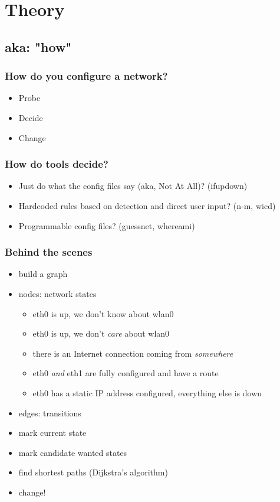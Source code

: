\documentclass[ignorenonframetext]{beamer}
\begin{document}
\section{Theory}
\subsection{aka: "how"}
\begin{frame}
  \frametitle{How do you configure a network?}
  \begin{itemize}
    \item Probe
    \item Decide
    \item Change
  \end{itemize}
\end{frame}

\begin{frame}
  \frametitle{How do tools decide?}
  \begin{itemize}
    \item Just do what the config files say (aka, Not At All)? (ifupdown)
    \item Hardcoded rules based on detection and direct user input? (n-m, wicd)
    \item Programmable config files? (guessnet, whereami)
  \end{itemize}
\end{frame}

\begin{frame}
  \frametitle{Behind the scenes}
  \begin{itemize}
    \item build a graph
    \item nodes: network states
    \begin{itemize}
      \item eth0 is up, we don't know about wlan0
      \item eth0 is up, we don't \emph{care} about wlan0
      \item there is an Internet connection coming from \emph{somewhere}
      \item eth0 \emph{and} eth1 are fully configured and have a route
      \item eth0 has a static IP address configured, everything else is down
    \end{itemize}
    \item edges: transitions
    \item mark current state
    \item mark candidate wanted states
    \item find shortest paths (Dijkstra's algorithm)
    \item change!
  \end{itemize}
\end{frame}
\end{document}
